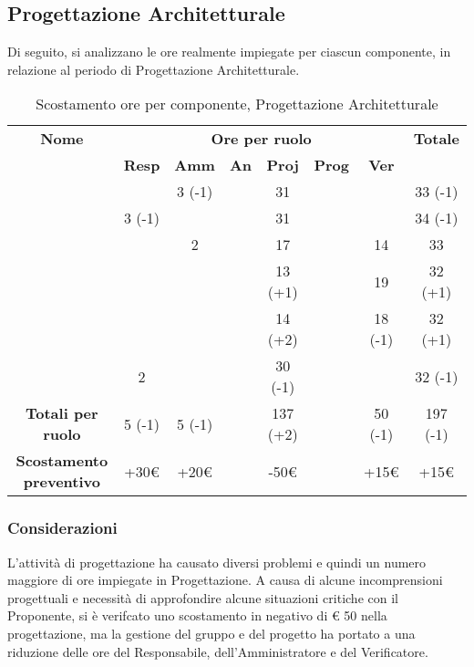 \newpage
\subsection{Progettazione Architetturale}

Di seguito, si analizzano le ore realmente impiegate per ciascun componente, in relazione al periodo di Progettazione Architetturale.

\begin{table}[H]
	\begin{center}
		\begin{tabular}{|c|c|c|c|c|c|c|c|}
			\hline
			\textbf{Nome} & \multicolumn{6}{c|}{\textbf{Ore per ruolo}} & \textbf{Totale} \\\cline{2-7}
			& \textbf{Resp} & \textbf{Amm} & \textbf{An} & \textbf{Proj} & \textbf{Prog} & \textbf{Ver} & \\
			\hline
			\MC			&		&	3 (-1)	&		&	31		&		&		&   33	(-1)\\
			\hline
			\AN			&3 (-1)	&			&		&	31		&		&		& 	34 (-1)	\\
			\hline
			\DAN		&		&	2		&		&	17		&		&	14	&	33	\\
			\hline
			\AS			&		&		 	&	 	&	13 (+1)	&	 	& 	19	&	32 (+1)	\\
			\hline
			\NS 		&		&			&		&	14 (+2)	&		& 	18 (-1)	&	32 (+1)	\\
			\hline
			\DS			& 	2	&			&		&	30 (-1)	&		&		&	32 (-1)	\\
			\hline
			\textbf{Totali per ruolo}	& 	5 (-1)	&	5 (-1)	&		&	137 (+2)	&		&	50 (-1)	&	197 (-1)	\\
			\hline
			\textbf{Scostamento preventivo}	& 	+30€	&	+20€	&		&	-50€	&		&	+15€	&	+15€	\\
			\hline
		\end{tabular}
	\end{center}
	\caption{Scostamento ore per componente, Progettazione Architetturale}
\end{table}

\subsubsection{Considerazioni}
L'attività di progettazione ha causato diversi problemi e quindi un numero maggiore di ore impiegate in Progettazione. A causa di alcune incomprensioni progettuali e necessità di approfondire alcune situazioni critiche con il Proponente, si è verifcato uno scostamento in negativo di € 50 nella progettazione, ma la gestione del gruppo e del progetto ha portato a una riduzione delle ore del Responsabile, dell'Amministratore e del Verificatore.

